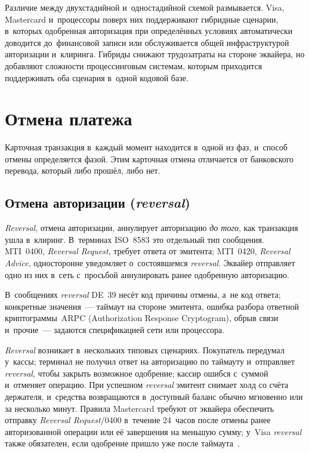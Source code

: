 Различие между двухстадийной и~одностадийной схемой размывается. Visa,
Mastercard и~процессоры поверх них поддерживают гибридные сценарии, в~которых
одобренная авторизация при определённых условиях автоматически доводится
до~финансовой записи или обслуживается общей инфраструктурой авторизации
и~клиринга. Гибриды снижают трудозатраты на стороне эквайера, но добавляют
сложности процессинговым системам, которым приходится поддерживать оба сценария
в~одной кодовой базе.

\section{Отмена платежа}\label{sec:tx-cancellation}

Карточная транзакция в~каждый момент находится в~одной из фаз, и~способ отмены
определяется фазой. Этим карточная отмена отличается от банковского перевода,
который либо прошёл, либо нет.

\subsection*{Отмена авторизации (\textit{reversal})}

\textit{Reversal}, отмена авторизации, аннулирует авторизацию \emph{до того}, как транзакция
ушла в~клиринг. В~терминах ISO~8583 это отдельный тип сообщения. MTI~0400,
\textit{Reversal Request}, требует ответа от эмитента; MTI~0420, \textit{Reversal
Advice}, односторонне уведомляет о~состоявшемся \textit{reversal}. Эквайер отправляет одно из них в~сеть
с~просьбой аннулировать ранее одобренную авторизацию.

В~сообщениях \textit{reversal} DE~39 несёт код причины отмены, а~не код ответа;
конкретные значения~--- таймаут на стороне эмитента, ошибка разбора ответной
криптограммы~ARPC (Authorization Response Cryptogram),
обрыв связи и~прочие~--- задаются спецификацией сети или процессора.

\textit{Reversal} возникает в~нескольких типовых сценариях. Покупатель передумал у~кассы;
терминал не получил ответ на авторизацию по таймауту и~отправляет \textit{reversal},
чтобы закрыть возможное одобрение; кассир ошибся с~суммой и~отменяет операцию.
При успешном \textit{reversal} эмитент снимает холд со счёта держателя, и~средства возвращаются
в~доступный баланс обычно мгновенно или за несколько минут. Правила Mastercard
требуют от эквайера обеспечить отправку \textit{Reversal
Request}/0400 в~течение 24~часов после отмены ранее авторизованной операции или
её завершения на меньшую сумму; у~Visa \textit{reversal} также обязателен, если одобрение
пришло уже после таймаута~\cite{visa-core-rules,visa-tadg,mc-tpr}.

